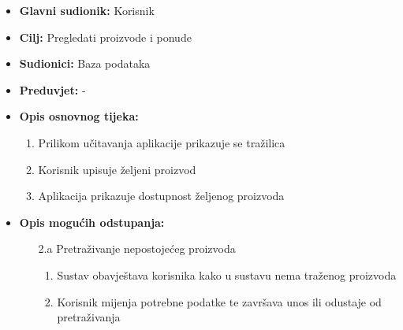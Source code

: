                         \noindent {}
					\begin{itemize}
	
						\item \textbf{Glavni sudionik: }Korisnik
						\item  \textbf{Cilj:} Pregledati proizvode i ponude
						\item  \textbf{Sudionici:} Baza podataka
						\item  \textbf{Preduvjet:} -
						\item  \textbf{Opis osnovnog tijeka:}
						
						\item[] \begin{enumerate}
							\item Prilikom učitavanja aplikacije prikazuje se tražilica
							\item Korisnik upisuje željeni proizvod
							\item Aplikacija prikazuje dostupnost željenog proizvoda\\
						\end{enumerate}
					\item  \textbf{Opis mogućih odstupanja:}
					
					\item[] \begin{enumerate}
						
						\item[2.a] Pretraživanje nepostojećeg proizvoda
						\item[] \begin{enumerate}
							
							\item Sustav obavještava korisnika kako u sustavu nema traženog proizvoda
							\item Korisnik mijenja potrebne podatke te završava unos ili odustaje od pretraživanja\\
							
						\end{enumerate}
						
						
					\end{enumerate}
						
					\end{itemize}


